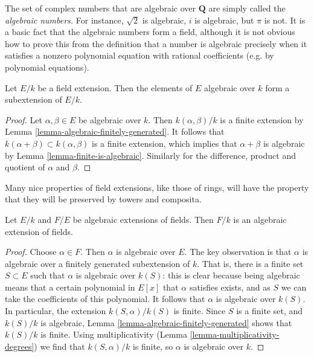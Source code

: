 \noindent
The set of complex numbers that are algebraic over $\mathbf{Q}$ are simply
called the {\it algebraic numbers.} For instance, $\sqrt{2}$ is algebraic,
$i$ is algebraic, but $\pi$ is not.
It is a basic fact that the algebraic numbers form a field, although it is not
obvious how to prove this from the definition that a number is algebraic
precisely when it satisfies a nonzero polynomial equation with rational
coefficients (e.g. by polynomial equations).

\begin{lemma}
\label{lemma-algebraic-elements}
Let $E/k$ be a field extension. Then the elements of $E$ algebraic over $k$
form a subextension of $E/k$.
\end{lemma}

\begin{proof}
Let $\alpha, \beta \in E$ be algebraic over $k$. Then $k(\alpha, \beta)/k$
is a finite extension by Lemma \ref{lemma-algebraic-finitely-generated}.
It follows that $k(\alpha + \beta) \subset k(\alpha, \beta)$ is a finite
extension, which implies that $\alpha + \beta$ is algebraic by
Lemma \ref{lemma-finite-is-algebraic}. Similarly for the difference,
product and quotient of $\alpha$ and $\beta$.
\end{proof}

\noindent
Many nice properties of field extensions, like those of rings, will have the
property that they will be preserved by towers and composita.

\begin{lemma}
\label{lemma-algebraic-permanence}
Let $E/k$ and $F/E$ be algebraic extensions of fields. Then $F/k$ is an
algebraic extension of fields.
\end{lemma}

\begin{proof}
Choose $\alpha \in F$. Then $\alpha$ is algebraic over $E$.
The key observation is that $\alpha$ is algebraic over a
finitely generated subextension of $k$.
That is, there is a finite set $S \subset E$ such that $\alpha $ is algebraic
over $k(S)$: this is clear because being algebraic means that a certain
polynomial in $E[x]$ that $\alpha$ satisfies exists, and as $S$ we can take the
coefficients of this polynomial. It follows that $\alpha$ is algebraic over
$k(S)$. In particular, the extension $k(S, \alpha)/ k(S)$ is finite.
Since $S$ is a finite set, and $k(S)/k$ is algebraic,
Lemma \ref{lemma-algebraic-finitely-generated} shows that
$k(S)/k$ is finite. Using multiplicativity
(Lemma \ref{lemma-multiplicativity-degrees})
we find that $k(S,\alpha)/k$ is finite, so $\alpha$ is algebraic over $k$.
\end{proof}

